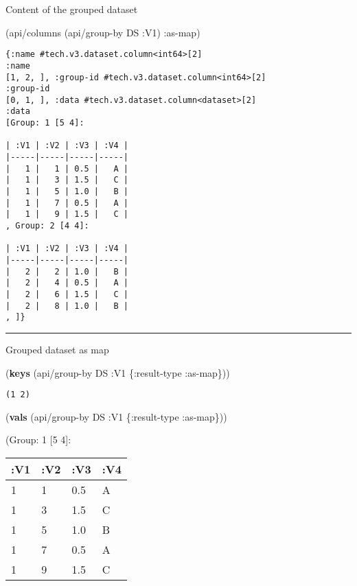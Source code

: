 \documentclass[]{article}
\newenvironment{Shaded}{\begin{snugshade}}{\end{snugshade}}
\newcommand{\AttributeTok}[1]{\textcolor[rgb]{0.77,0.63,0.00}{#1}}
\newcommand{\KeywordTok}[1]{\textcolor[rgb]{0.13,0.29,0.53}{\textbf{#1}}}
\newcommand{\NormalTok}[1]{#1}
\begin{document}
Content of the grouped dataset

\begin{Shaded}
\begin{Highlighting}[]
\NormalTok{(api/columns (api/group-by DS }\AttributeTok{:V1}\NormalTok{) }\AttributeTok{:as-map}\NormalTok{)}
\end{Highlighting}
\end{Shaded}

\begin{verbatim}
{:name #tech.v3.dataset.column<int64>[2]
:name
[1, 2, ], :group-id #tech.v3.dataset.column<int64>[2]
:group-id
[0, 1, ], :data #tech.v3.dataset.column<dataset>[2]
:data
[Group: 1 [5 4]:

| :V1 | :V2 | :V3 | :V4 |
|-----|-----|-----|-----|
|   1 |   1 | 0.5 |   A |
|   1 |   3 | 1.5 |   C |
|   1 |   5 | 1.0 |   B |
|   1 |   7 | 0.5 |   A |
|   1 |   9 | 1.5 |   C |
, Group: 2 [4 4]:

| :V1 | :V2 | :V3 | :V4 |
|-----|-----|-----|-----|
|   2 |   2 | 1.0 |   B |
|   2 |   4 | 0.5 |   A |
|   2 |   6 | 1.5 |   C |
|   2 |   8 | 1.0 |   B |
, ]}
\end{verbatim}

\begin{center}\rule{0.5\linewidth}{0.5pt}\end{center}

Grouped dataset as map

\begin{Shaded}
\begin{Highlighting}[]
\NormalTok{(}\KeywordTok{keys}\NormalTok{ (api/group-by DS }\AttributeTok{:V1}\NormalTok{ \{}\AttributeTok{:result-type} \AttributeTok{:as-map}\NormalTok{\}))}
\end{Highlighting}
\end{Shaded}

\begin{verbatim}
(1 2)
\end{verbatim}

\begin{Shaded}
\begin{Highlighting}[]
\NormalTok{(}\KeywordTok{vals}\NormalTok{ (api/group-by DS }\AttributeTok{:V1}\NormalTok{ \{}\AttributeTok{:result-type} \AttributeTok{:as-map}\NormalTok{\}))}
\end{Highlighting}
\end{Shaded}

(Group: 1 {[}5 4{]}:

\begin{longtable}[]{@{}llll@{}}
\toprule
:V1 & :V2 & :V3 & :V4\tabularnewline
\midrule
\endhead
1 & 1 & 0.5 & A\tabularnewline
1 & 3 & 1.5 & C\tabularnewline
1 & 5 & 1.0 & B\tabularnewline
1 & 7 & 0.5 & A\tabularnewline
1 & 9 & 1.5 & C\tabularnewline
\bottomrule
\end{longtable}
\end{document}
